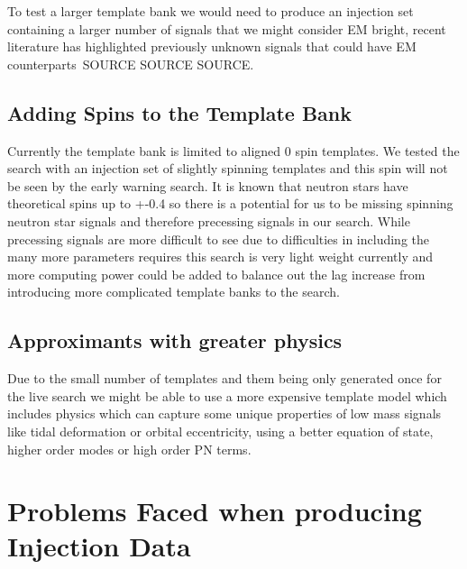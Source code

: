 To test a larger template bank we would need to produce an injection set containing a larger number of signals that we might consider EM bright, recent literature has highlighted previously unknown signals that could have EM counterparts~SOURCE SOURCE SOURCE.

\subsection{Adding Spins to the Template Bank}
Currently the template bank is limited to aligned 0 spin templates. We tested the search with an injection set of slightly spinning templates and this spin will not be seen by the early warning search. It is known that neutron stars have theoretical spins up to +-0.4 so there is a potential for us to be missing spinning neutron star signals and therefore precessing signals in our search. While precessing signals are more difficult to see due to difficulties in including the many more parameters requires this search is very light weight currently and more computing power could be added to balance out the lag increase from introducing more complicated template banks to the search.

\subsection{Approximants with greater physics}
Due to the small number of templates and them being only generated once for the live search we might be able to use a more expensive template model which includes physics which can capture some unique properties of low mass signals like tidal deformation or orbital eccentricity, using a better equation of state, higher order modes or high order PN terms.







\section{Problems Faced when producing Injection Data}

